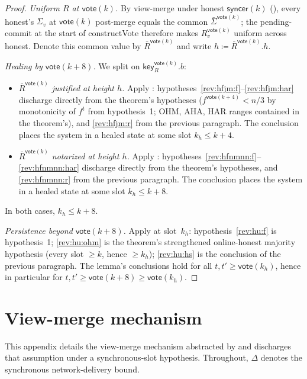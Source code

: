 \ifx\litemode\undefined\documentclass{article}\fi
\newcommand{\key}{\mathsf{key}}
\newcommand{\syncer}{\mathsf{syncer}}
\newcommand{\vote}{\mathsf{vote}}
\newcommand{\comm}[1]{\bar{#1}}
\newcommand{\constructVote}{\textsf{constructVote}\xspace}
\theoremstyle{plain}
\theoremstyle{definition}
\theoremstyle{remark}
\newcommand{\OHM}{online-honest majority\xspace}
\begin{document}
\begin{proof}
\emph{Uniform $R$ at $\vote(k)$.}
By view-merge under honest $\syncer(k)$ (), every honest's $\Sigma_v$ at $\vote(k)$ post-merge equals the common $\comm{\Sigma}^{\vote(k)}$; the pending-commit at the start of \constructVote{} therefore makes $R_v^{\vote(k)}$ uniform across honest. Denote this common value by $\comm{R}^{\vote(k)}$ and write $h \coloneqq \comm{R}^{\vote(k)}.h$.

\emph{Healing by $\vote(k+8)$.}
We split on $\key_R^{\vote(k)}.b$:
\begin{itemize}
  \item \emph{$\comm{R}^{\vote(k)}$ justified at height $h$.} Apply : hypotheses~\ref{rev:hfjm:f}--\ref{rev:hfjm:har} discharge directly from the theorem's hypotheses ($f^{\vote(k+4)} < n/3$ by monotonicity of $f^t$ from hypothesis~1; OHM, AHA, HAR ranges contained in the theorem's), and \ref{rev:hfjm:r} from the previous paragraph. The conclusion places the system in a healed state at some slot $k_h \leq k+4$.
  \item \emph{$\comm{R}^{\vote(k)}$ notarized at height $h$.} Apply : hypotheses~\ref{rev:hfnmnn:f}--\ref{rev:hfnmnn:har} discharge directly from the theorem's hypotheses, and \ref{rev:hfnmnn:r} from the previous paragraph. The conclusion places the system in a healed state at some slot $k_h \leq k+8$.
\end{itemize}
In both cases, $k_h \leq k+8$.

\emph{Persistence beyond $\vote(k+8)$.}
Apply  at slot~$k_h$: hypothesis~\ref{rev:hu:f} is hypothesis~1; \ref{rev:hu:ohm} is the theorem's strengthened \OHM hypothesis (every slot $\geq k$, hence $\geq k_h$); \ref{rev:hu:hs} is the conclusion of the previous paragraph. The lemma's conclusions hold for all $t, t' \geq \vote(k_h)$, hence in particular for $t, t' \geq \vote(k+8) \geq \vote(k_h)$.
\end{proof}

\appendix

\section{View-merge mechanism}\label{app:view-merge}

This appendix details the view-merge mechanism abstracted by  and discharges that assumption under a synchronous-slot hypothesis.
Throughout, $\Delta$ denotes the synchronous network-delivery bound.
\end{document}
